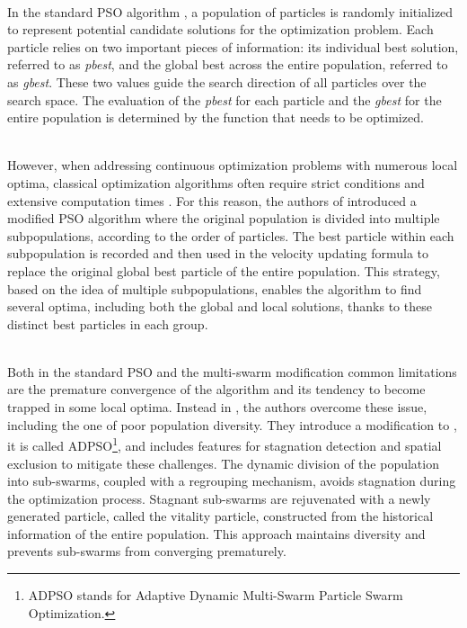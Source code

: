 \documentclass[main]{subfiles}
\begin{document}
\noindent\\
In the standard PSO algorithm \cite{PSO_original}, a population of particles is 
randomly initialized to represent potential candidate solutions for the optimization problem. 
Each particle relies on two important pieces of information: its individual 
best solution, referred to as \textit{pbest}, and the global best across the entire population, 
referred to as \textit{gbest}. These two values guide the search direction of all particles 
over the search space. 
The evaluation of the \textit{pbest} for each particle and the \textit{gbest} for 
the entire population is determined by the function that needs to be optimized.

\noindent\\
However, when addressing continuous optimization problems with numerous local optima, 
classical optimization algorithms often require strict conditions 
and extensive computation times \cite{PSO_another}.
For this reason, the authors of  \cite{PSO_IMPORTANT} introduced a modified PSO algorithm 
where the original population is divided into multiple subpopulations, 
according to the order of particles.
The best particle within each subpopulation is recorded and then 
used in the velocity updating formula to replace 
the original global best particle of the entire population.
This strategy, based on the idea of multiple subpopulations, 
enables the algorithm to find several optima, including both
the global and local solutions, thanks to these distinct best particles
in each group.

\noindent\\
Both in the standard PSO \cite{PSO_original} and the multi-swarm modification \cite{PSO_IMPORTANT}
common limitations are the premature convergence of the algorithm 
and its tendency to become trapped in some local optima.
Instead in \cite{PSO_another}, the authors overcome these issue,
including the one of poor population diversity. 
They introduce a modification to \cite{PSO_IMPORTANT}, it is called 
ADPSO\footnote{ADPSO stands for Adaptive Dynamic Multi-Swarm Particle Swarm Optimization.}, 
and includes features for stagnation detection and spatial exclusion to mitigate these challenges. 
The dynamic division of the population into sub-swarms, 
coupled with a regrouping mechanism, avoids stagnation during the optimization process. 
Stagnant sub-swarms are rejuvenated with a newly generated particle, 
called the vitality particle, constructed from the historical information of the entire population. 
This approach maintains diversity and prevents sub-swarms from converging prematurely.
\end{document}
